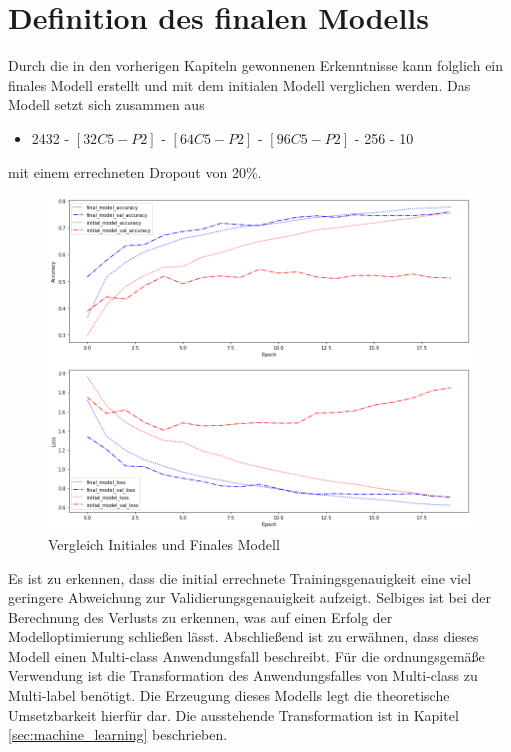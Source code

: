 \newpage

\section{Definition des finalen Modells}

Durch die in den vorherigen Kapiteln gewonnenen Erkenntnisse kann folglich ein finales Modell erstellt und mit dem initialen Modell verglichen werden. Das Modell setzt sich zusammen aus

\begin{itemize}
	\item 2432 - $[32C5-P2]$ - $[64C5-P2]$ - $[96C5-P2]$ - 256 - 10 
\end{itemize}

mit einem errechneten Dropout von 20\%.

\begin{figure}[htb]
	\centering
	\includegraphics[width=\textwidth]{images/comparison_initial_final}
	\caption{Vergleich Initiales und Finales Modell}
	\label{fig:comparison_initial_final}
\end{figure}

Es ist zu erkennen, dass die initial errechnete Trainingsgenauigkeit eine viel geringere Abweichung zur Validierungsgenauigkeit aufzeigt. Selbiges ist bei der Berechnung des Verlusts zu erkennen, was auf einen Erfolg der Modelloptimierung schließen lässt. 
Abschließend ist zu erwähnen, dass dieses Modell einen Multi-class Anwendungsfall beschreibt. Für die ordnungsgemäße Verwendung ist die Transformation des Anwendungsfalles von Multi-class zu Multi-label benötigt. Die Erzeugung dieses Modells legt die theoretische Umsetzbarkeit hierfür dar. Die ausstehende Transformation ist in Kapitel \ref{sec:machine_learning} beschrieben.

